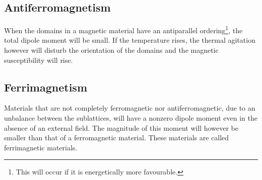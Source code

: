 \subsection{Antiferromagnetism}

    When the domains in a magnetic material have an antiparallel ordering\footnote{This will occur if it is energetically more favourable.}, the total dipole moment will be small. If the temperature rises, the thermal agitation however will disturb the orientation of the domains and the magnetic susceptibility will rise.


\subsection{Ferrimagnetism}

    Materials that are not completely ferromagnetic nor antiferromagnetic, due to an unbalance between the sublattices, will have a nonzero dipole moment even in the absence of an external field. The magnitude of this moment will however be smaller than that of a ferromagnetic material. These materials are called ferrimagnetic materials.

